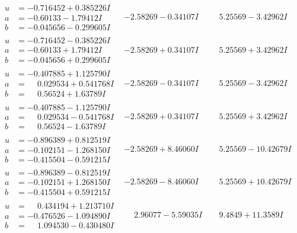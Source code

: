 \documentclass[1p]{elsarticle_modified}
\theoremstyle{definition}
\begin{document}
$$\begin{array}{c|c|c}
\begin{aligned}
u &= -0.716452 + 0.385226 I \\
a &= -0.60133 - 1.79412 I \\
b &= -0.045656 - 0.299605 I\end{aligned}
 & -2.58269 - 0.34107 I & \phantom{-}5.25569 - 3.42962 I \\ \hline\begin{aligned}
u &= -0.716452 - 0.385226 I \\
a &= -0.60133 + 1.79412 I \\
b &= -0.045656 + 0.299605 I\end{aligned}
 & -2.58269 + 0.34107 I & \phantom{-}5.25569 + 3.42962 I \\ \hline\begin{aligned}
u &= -0.407885 + 1.125790 I \\
a &= \phantom{-}0.029534 + 0.541768 I \\
b &= \phantom{-}0.56524 + 1.63789 I\end{aligned}
 & -2.58269 - 0.34107 I & \phantom{-}5.25569 - 3.42962 I \\ \hline\begin{aligned}
u &= -0.407885 - 1.125790 I \\
a &= \phantom{-}0.029534 - 0.541768 I \\
b &= \phantom{-}0.56524 - 1.63789 I\end{aligned}
 & -2.58269 + 0.34107 I & \phantom{-}5.25569 + 3.42962 I \\ \hline\begin{aligned}
u &= -0.896389 + 0.812519 I \\
a &= -0.102151 - 1.268150 I \\
b &= -0.415504 - 0.591215 I\end{aligned}
 & -2.58269 + 8.46060 I & \phantom{-}5.25569 - 10.42679 I \\ \hline\begin{aligned}
u &= -0.896389 - 0.812519 I \\
a &= -0.102151 + 1.268150 I \\
b &= -0.415504 + 0.591215 I\end{aligned}
 & -2.58269 - 8.46060 I & \phantom{-}5.25569 + 10.42679 I \\ \hline\begin{aligned}
u &= \phantom{-}0.434194 + 1.213710 I \\
a &= -0.476526 - 1.094890 I \\
b &= \phantom{-}1.094530 - 0.430480 I\end{aligned}
 & \phantom{-}2.96077 - 5.59035 I & \phantom{-}9.4849 + 11.3589 I \\ \hline\begin{aligned}

\end{aligned}
\end{array}$$
\end{document}
